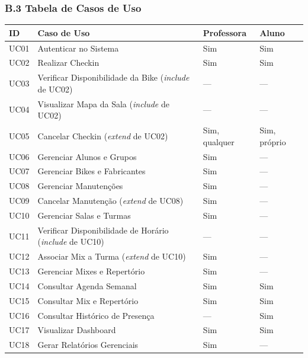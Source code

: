 \subsubsection*{B.3 Tabela de Casos de Uso}
\begin{longtable}{@{}>{\raggedright\arraybackslash}p{}>{\raggedright\arraybackslash}p{}>{\centering\arraybackslash}p{}>{\centering\arraybackslash}p{}@{}}
\toprule
\textbf{ID} & \textbf{Caso de Uso} & \textbf{Professora} & \textbf{Aluno} \\ \hline
\midrule
\endfirsthead



UC01 & Autenticar no Sistema & Sim & Sim \\ \hline
UC02 & Realizar Checkin & Sim & Sim \\ \hline
UC03 & Verificar Disponibilidade da Bike (\textit{include} de UC02) & --- & --- \\ \hline
UC04 & Visualizar Mapa da Sala (\textit{include} de UC02) & --- & --- \\ \hline
UC05 & Cancelar Checkin (\textit{extend} de UC02) & Sim, qualquer & Sim, próprio \\ \hline
UC06 & Gerenciar Alunos e Grupos & Sim & --- \\ \hline
UC07 & Gerenciar Bikes e Fabricantes & Sim & --- \\ \hline
UC08 & Gerenciar Manutenções & Sim & --- \\ \hline
UC09 & Cancelar Manutenção (\textit{extend} de UC08) & Sim & --- \\ \hline
UC10 & Gerenciar Salas e Turmas & Sim & --- \\ \hline
UC11 & Verificar Disponibilidade de Horário (\textit{include} de UC10) & --- & --- \\ \hline
UC12 & Associar Mix a Turma (\textit{extend} de UC10) & Sim & --- \\ \hline
UC13 & Gerenciar Mixes e Repertório & Sim & --- \\ \hline
UC14 & Consultar Agenda Semanal & Sim & Sim \\ \hline
UC15 & Consultar Mix e Repertório & Sim & Sim \\ \hline
UC16 & Consultar Histórico de Presença & --- & Sim \\ \hline
UC17 & Visualizar Dashboard & Sim & Sim \\ \hline
UC18 & Gerar Relatórios Gerenciais & Sim & --- \\ \hline
\bottomrule
\end{longtable}